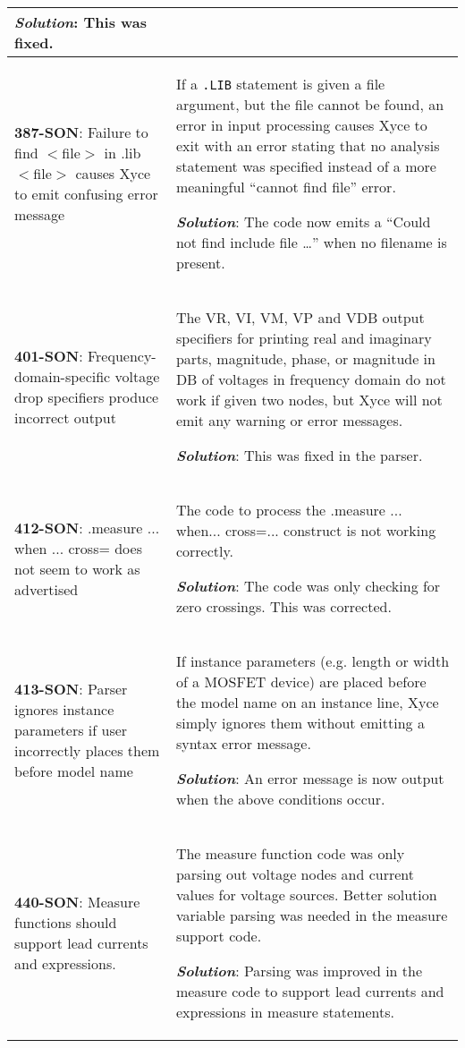 \begin{longtable}[h] {>{\raggedright\small}m{2in}|>{\raggedright\let\\\tabularnewline\small}m{3.5in}}
\textbf{\textit{Solution}}: This was fixed.
\\ \hline

\textbf{387-SON}: Failure to find $<$file$>$ in .lib $<$file$>$ causes Xyce to
emit confusing error message & If a \texttt{.LIB} statement is given a file
argument, but the file cannot be found, an error in input processing causes
Xyce to exit with an error stating that no analysis statement was specified
instead of a more meaningful ``cannot find file'' error.   

\textbf{\textit{Solution}}: The code now emits a ``Could not find include file
\ldots'' when no filename is present.
\\ \hline  


\textbf{401-SON}: Frequency-domain-specific voltage drop specifiers produce
incorrect output & The VR, VI, VM, VP and VDB output specifiers for printing
real and imaginary parts, magnitude, phase, or magnitude in DB of voltages in
frequency domain do not work if given two nodes, but Xyce will not emit any
warning or error messages.

\textbf{\textit{Solution}}: This was fixed in the parser.
\\ \hline


\textbf{412-SON}: .measure ... when ... cross= does not seem to work as advertised
& The code to process the .measure ... when... cross=... construct is not
working correctly. 

\textbf{\textit{Solution}}: The code was only checking for zero crossings. This
was corrected.
\\ \hline


\textbf{413-SON}: Parser ignores instance parameters if user incorrectly places
them before model name & If instance parameters (e.g. length or width of a
MOSFET device) are placed before the model name on an instance line, Xyce
simply ignores them without emitting a syntax error message.

\textbf{\textit{Solution}}: An error message is now output when the above
conditions occur.
\\ \hline


\textbf{440-SON}: Measure functions should support lead currents and expressions. &
The measure function code was only parsing out voltage nodes and current values for
voltage sources.  Better solution variable parsing was needed in the measure support code.

\textbf{\textit{Solution}}: Parsing was improved in the measure code to support lead 
currents and expressions in measure statements.  
\\ \hline


\end{longtable}
